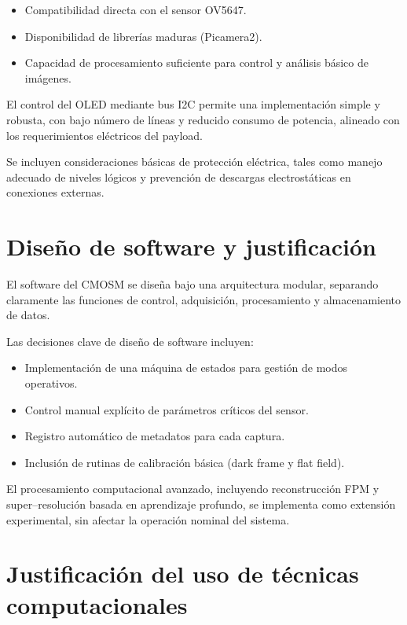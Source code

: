 \begin{itemize}
    \item Compatibilidad directa con el sensor OV5647.
    \item Disponibilidad de librerías maduras (Picamera2).
    \item Capacidad de procesamiento suficiente para control y análisis básico
    de imágenes.
\end{itemize}

El control del OLED mediante bus I2C permite una implementación simple y robusta,
con bajo número de líneas y reducido consumo de potencia, alineado con los
requerimientos eléctricos del payload.

Se incluyen consideraciones básicas de protección eléctrica, tales como manejo
adecuado de niveles lógicos y prevención de descargas electrostáticas en
conexiones externas.

\section{Diseño de software y justificación}

El software del CMOSM se diseña bajo una arquitectura modular, separando
claramente las funciones de control, adquisición, procesamiento y almacenamiento
de datos.

Las decisiones clave de diseño de software incluyen:

\begin{itemize}
    \item Implementación de una máquina de estados para gestión de modos
    operativos.
    \item Control manual explícito de parámetros críticos del sensor.
    \item Registro automático de metadatos para cada captura.
    \item Inclusión de rutinas de calibración básica (dark frame y flat field).
\end{itemize}

El procesamiento computacional avanzado, incluyendo reconstrucción FPM y
super--resolución basada en aprendizaje profundo, se implementa como extensión
experimental, sin afectar la operación nominal del sistema.

\section{Justificación del uso de técnicas computacionales}

